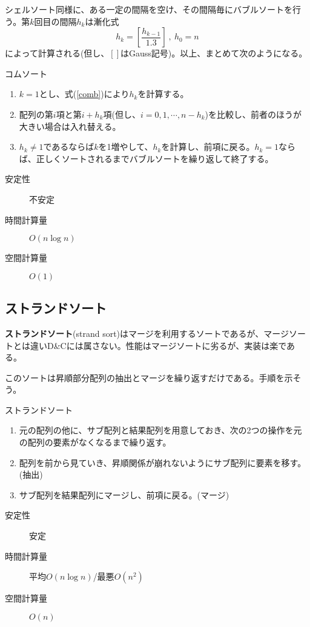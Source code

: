 シェルソート同様に、ある一定の間隔を空け、その間隔毎にバブルソートを行う。第$k$回目の間隔$h_k$は漸化式
\begin{equation}
h_k=\left[\frac{h_{k-1}}{1.3}\right]\ ,\ h_0=n \label{comb}
\end{equation}
によって計算される(但し、$[ ]$はGauss記号)。以上、まとめて次のようになる。
\begin{itembox}[l]{コムソート}
\begin{enumerate}
\item $k=1$とし、式(\ref{comb})により$h_k$を計算する。
\item 配列の第$i$項と第$i+h_k$項(但し、$i=0,1,\cdots,n-h_k$)を比較し、前者のほうが大きい場合は入れ替える。
\item $h_k\neq 1$であるならば$k$を1増やして、$h_k$を計算し、前項に戻る。$h_k=1$ならば、正しくソートされるまでバブルソートを繰り返して終了する。
\end{enumerate}
\begin{multicols}{3}
\begin{description}
\item[安定性] 不安定
\item[時間計算量] $O(n \log n)$
\item[空間計算量] $O(1)$
\end{description}
\end{multicols}
\end{itembox}

\subsection{ストランドソート}
\textbf{ストランドソート}(strand sort)はマージを利用するソートであるが、マージソートとは違いD\&Cには属さない。性能はマージソートに劣るが、実装は楽である。

このソートは昇順部分配列の抽出とマージを繰り返すだけである。手順を示そう。
\begin{itembox}[l]{ストランドソート}
\begin{enumerate}
\item 元の配列の他に、サブ配列と結果配列を用意しておき、次の2つの操作を元の配列の要素がなくなるまで繰り返す。
\item 配列を前から見ていき、昇順関係が崩れないようにサブ配列に要素を移す。(抽出)
\item サブ配列を結果配列にマージし、前項に戻る。(マージ)
\end{enumerate}
\begin{multicols}{2}
\begin{description}
\item[安定性] 安定
\item[時間計算量] 平均$O(n \log n)$/最悪$O(n^2)$
\item[空間計算量] $O(n)$
\end{description}
\end{multicols}
\end{itembox}

